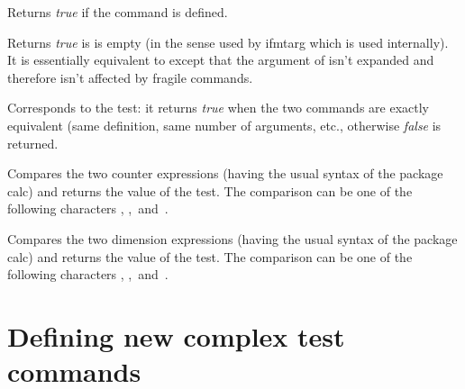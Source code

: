 \documentclass{article}
\newcommand*{\pack}{\textsf}
\newcommand*{\true}{\emph{true}}
\newcommand*{\false}{\emph{false}}
\begin{document}
\begin{displaytex}
\end{displaytex}
%
Returns \true{} if the command  is defined.

\begin{displaytex}
\end{displaytex}
%
Returns \true{} is  is empty (in the sense used by
\pack{ifmtarg} which is used internally).  It is essentially equivalent to
 except that the argument of
 isn't expanded and therefore isn't affected by fragile
commands.

\begin{displaytex}
\end{displaytex}
%
Corresponds to the  test: it returns \true{} when the two
commands are exactly equivalent (same definition, same number of
arguments, etc., otherwise \false{} is returned.

\begin{displaytex}
\end{displaytex}
%
Compares the two counter expressions (having the usual syntax of the
package \pack{calc}) and returns the value of the test.  The comparison
can be one of the following characters \tex{<}, \tex{>},~and~\tex{=}.

\begin{displaytex}
\end{displaytex}
%
Compares the two dimension expressions (having the usual syntax of the
package \pack{calc}) and returns the value of the test.  The comparison
can be one of the following characters \tex{<}, \tex{>},~and~\tex{=}.

\section{Defining new complex test commands}
\end{document}
